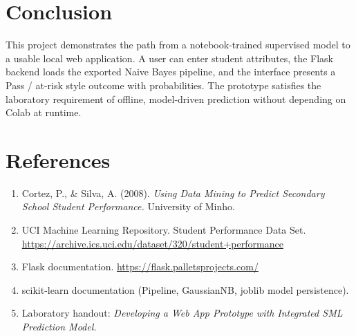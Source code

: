 \documentclass[11pt,a4paper]{article}
\begin{document}
\section{Conclusion}

This project demonstrates the path from a notebook-trained supervised model to a usable local web application. A user can enter student attributes, the Flask backend loads the exported Naive Bayes pipeline, and the interface presents a Pass / at-risk style outcome with probabilities. The prototype satisfies the laboratory requirement of offline, model-driven prediction without depending on Colab at runtime.

\section{References}

\begin{enumerate}[leftmargin=*]
  \item Cortez, P., \& Silva, A. (2008). \emph{Using Data Mining to Predict Secondary School Student Performance.} University of Minho.
  \item UCI Machine Learning Repository. Student Performance Data Set. \url{https://archive.ics.uci.edu/dataset/320/student+performance}
  \item Flask documentation. \url{https://flask.palletsprojects.com/}
  \item scikit-learn documentation (Pipeline, GaussianNB, joblib model persistence).
  \item Laboratory handout: \emph{Developing a Web App Prototype with Integrated SML Prediction Model.}
\end{enumerate}
\end{document}
